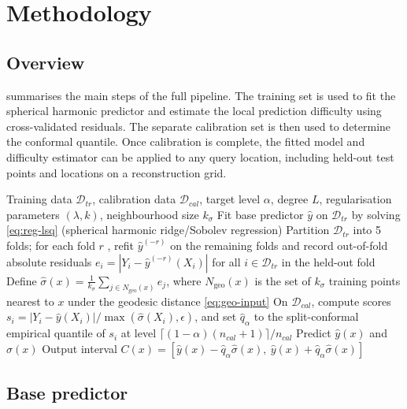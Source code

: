 \chapter{Methodology}
\label{ch:methodology}

\section{Overview}

 summarises the main steps of the full pipeline. The training set is used to fit the spherical harmonic predictor and estimate the local prediction difficulty using cross-validated residuals. The separate calibration set is then used to determine the conformal quantile. Once calibration is complete, the fitted model and difficulty estimator can be applied to any query location, including held-out test points and locations on a reconstruction grid.

\begin{algorithm}[htbp]
\caption{Adaptive geodesic-neighbourhood conformal prediction for scalar fields on $S^2$}
\label{alg:main}
\begin{algorithmic}[1]
\Require Training data $\mathcal{D}_{tr}$, calibration data $\mathcal{D}_{cal}$, target level $\alpha$, degree $L$, regularisation parameters $(\lambda,k)$, neighbourhood size $k_\sigma$
\State Fit base predictor $\hat y$ on $\mathcal{D}_{tr}$ by solving \cref{eq:reg-lsq} (spherical harmonic ridge/Sobolev regression)
\State Partition $\mathcal{D}_{tr}$ into 5 folds; for each fold $r$ , refit $\hat y^{(-r)}$ on the remaining folds and record out-of-fold absolute residuals $e_i = |Y_i - \hat y^{(-r)}(X_i)|$ for all $i \in \mathcal{D}_{tr}$ in the held-out fold
\State Define $\hat\sigma(x) = \frac{1}{k_\sigma}\sum_{j \in N_{\mathrm{geo}}(x)} e_j$, where $N_{\mathrm{geo}}(x)$ is the set of $k_\sigma$ training points nearest to $x$ under the geodesic distance \cref{eq:geo-input}
\State On $\mathcal{D}_{cal}$, compute scores $s_i = |Y_i - \hat y(X_i)| / \max(\hat\sigma(X_i),\epsilon)$, and set $\hat q_\alpha$ to the split-conformal empirical quantile of $s_i$ at level $\lceil (1-\alpha)(n_{cal}+1)\rceil / n_{cal}$ 
    \State Predict $\hat y(x)$ and $\hat\sigma(x)$
    \State Output interval $C(x) = [\hat y(x) - \hat q_\alpha \hat\sigma(x),\ \hat y(x) + \hat q_\alpha \hat\sigma(x)]$
\EndFor
\end{algorithmic}
\end{algorithm}

\section{Base predictor}

